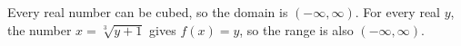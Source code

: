 Every real number can be cubed, so the domain is $\boxed{(-\infty,\infty)}$. For every real $y$, the number $x=\sqrt[3]{y+1}$ gives $f(x)=y$, so the range is also $\boxed{(-\infty,\infty)}$.
